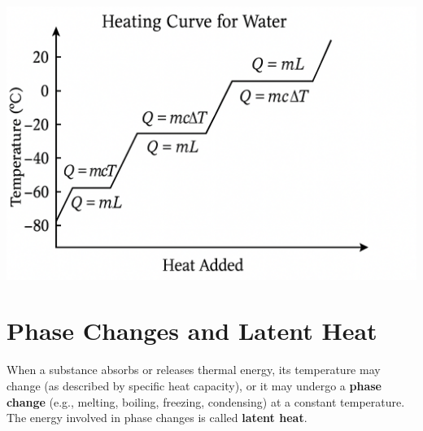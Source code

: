 \begin{marginfigure}[10pt] %
\includegraphics[width=\linewidth]{water_heating.png} %
\caption{Heating curve for water. Sloped sections represent temperature increases (Q=mc\textDelta T applies). Flat sections represent phase changes at constant temperature (Q=mL applies): melting at 0°C and boiling at 100°C.}
\label{fig:heating_curve}
\end{marginfigure}
\FloatBarrier

\section{Phase Changes and Latent Heat}
\label{sec:latent_heat}
\FloatBarrier

When a substance absorbs or releases thermal energy, its temperature may change (as described by specific heat capacity), or it may undergo a \textbf{phase change} (e.g., melting, boiling, freezing, condensing) at a constant temperature. The energy involved in phase changes is called \textbf{latent heat}.

